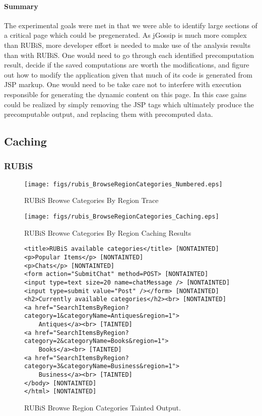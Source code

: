 \documentclass[msc,oneside]{ubcthesis}
\begin{document}
\paragraph{Summary}
The experimental goals were met in that we were able to identify large sections of a critical page which could be pregenerated. As jGossip is much more complex than RUBiS, more developer effort is needed to make use of the analysis results than with RUBiS. One would need to go through each identified precomputation result, decide if the saved computations are worth the modifications, and figure out how to modify the application given that much of its code is generated from JSP markup. One would need to be take care not to interfere with execution responsible for generating the dynamic content on this page. In this case gains could be realized by simply removing the JSP tags which ultimately produce the precomputable output, and replacing them with precomputed data.

\subsection{Caching}
\label{ana:caching}
\subsubsection{RUBiS}

\begin{sidewaysfigure}
\centering
\scalebox{0.43}
{\texttt{[image: figs/rubis\_BrowseRegionCategories\_Numbered.eps]}}
\caption{RUBiS Browse Categories By Region Trace} 
\label{fig:browseregioncategories}
\end{sidewaysfigure}

\begin{sidewaysfigure}
\centering
\scalebox{0.41}
{\texttt{[image: figs/rubis\_BrowseRegionCategories\_Caching.eps]}}
\caption{RUBiS Browse Categories By Region Caching Results} 
\label{fig:browseregioncategoriescaching}
\end{sidewaysfigure}

\begin{figure}[ht]
  \caption{\label{fig:browseregioncategoriesto} RUBiS Browse Region Categories Tainted Output.}
\begin{verbatim}
<title>RUBiS available categories</title> [NONTAINTED]
<p>Popular Items</p> [NONTAINTED]
<p>Chats</p> [NONTAINTED]
<form action="SubmitChat" method=POST> [NONTAINTED]
<input type=text size=20 name=chatMessage /> [NONTAINTED]
<input type=submit value="Post" /></form> [NONTAINTED]
<h2>Currently available categories</h2><br> [NONTAINTED]
<a href="SearchItemsByRegion?category=1&categoryName=Antiques&region=1">
    Antiques</a><br> [TAINTED]
<a href="SearchItemsByRegion?category=2&categoryName=Books&region=1">
    Books</a><br> [TAINTED]
<a href="SearchItemsByRegion?category=3&categoryName=Business&region=1">
    Business</a><br> [TAINTED]
</body> [NONTAINTED]
</html> [NONTAINTED]
\end{verbatim}
\end{figure}
\end{document}
